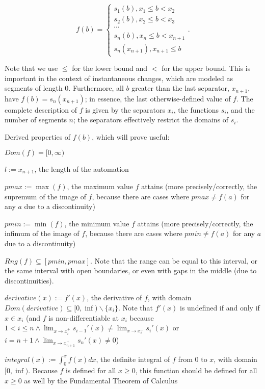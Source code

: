\documentclass{article}
\begin{document}
$$f(b) = \begin{cases}
s_1(b), x_1 \leq b < x_2 \\
s_2(b), x_2 \leq b < x_3 \\
\cdots \\
s_n(b), x_n \leq b < x_{n+1} \\
s_n(x_{n+1}), x_{n+1} \leq b
\end{cases}.$$

Note that we use $\leq$ for the lower bound and $<$ for the upper bound. This is important in the context of instantaneous changes, which are modeled as segments of length $0$. Furthermore, all $b$ greater than the last separator, $x_{n+1}$, have $f(b) = s_n(x_{n+1})$; in essence, the last otherwise-defined value of $f$. The complete description of $f$ is given by the separators $x_i$, the functions $s_i$, and the number of segments $n$; the separators effectively restrict the domains of $s_i$.

Derived properties of $f(b)$, which will prove useful:

$Dom(f)=[0,\infty)$

$l:=x_{n+1}$, the length of the automation

$pmax:=\max (f)$, the maximum value $f$ attains (more precisely/correctly, the supremum of the image of $f$, because there are cases where $pmax\neq f(a)$ for any $a$ due to a discontinuity)

$pmin:=\min (f)$, the minimum value $f$ attains (more precisely/correctly, the infimum of the image of $f$, because there are cases where $pmin\neq f(a)$ for any $a$ due to a discontinuity)

$Rng(f) \subseteq [pmin, pmax]$. Note that the range can be equal to this interval, or the same interval with open boundaries, or even with gaps in the middle (due to discontinuities).

$derivative(x) := f'(x)$, the derivative of $f$, with domain $Dom(derivative) \subseteq [0, \inf) \backslash \{x_i\} $. Note that $f'(x)$ is undefined if and only if $x\in x_i$ (and $f$ is non-differentiable at $x_i$ because $1<i\leq n \land \lim_{x\to x_i^+} s_{i-1}'(x)\neq \lim_{x\to x_i^-} s_{i}'(x)$ or $i = n+1\land \lim_{x\to x_{n+1}^+} s_n'(x) \neq 0$)

$integral(x) := \int_{0}^{x} f(x) dx$, the definite integral of $f$ from $0$ to $x$, with domain $[0, \inf)$. Because $f$ is defined for all $x\geq 0$, this function should be defined for all $x\geq 0$ as well by the Fundamental Theorem of Calculus
\end{document}
